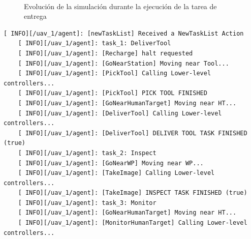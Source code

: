 \documentclass[fontsize=11pt, English=false, Español=true, Myfinal=true, twoside, numbers=noenddot]{scrbook}
\begin{document}
\begin{figure}[htbp]
    \\
    \hfill
    \caption{Evolución de la simulación durante la ejecución de la tarea de entrega}
    \label{fig:Gazebo_DeliverTree}
\end{figure}

\begin{lstlisting}[caption={Mensajes impresos por el Gestor de comportamiento durante la ejecución del plan completo}, breaklines=true, label=exit:firstPlanFeedback]
    [ INFO][/uav_1/agent]: [newTaskList] Received a NewTaskList Action
    [ INFO][/uav_1/agent]: task_1: DeliverTool
    [ INFO][/uav_1/agent]: [Recharge] halt requested
    [ INFO][/uav_1/agent]: [GoNearStation] Moving near Tool...
    [ INFO][/uav_1/agent]: [PickTool] Calling Lower-level controllers...
    [ INFO][/uav_1/agent]: [PickTool] PICK TOOL FINISHED
    [ INFO][/uav_1/agent]: [GoNearHumanTarget] Moving near HT...
    [ INFO][/uav_1/agent]: [DeliverTool] Calling Lower-level controllers...
    [ INFO][/uav_1/agent]: [DeliverTool] DELIVER TOOL TASK FINISHED (true)
    [ INFO][/uav_1/agent]: task_2: Inspect
    [ INFO][/uav_1/agent]: [GoNearWP] Moving near WP...
    [ INFO][/uav_1/agent]: [TakeImage] Calling Lower-level controllers...
    [ INFO][/uav_1/agent]: [TakeImage] INSPECT TASK FINISHED (true)
    [ INFO][/uav_1/agent]: task_3: Monitor
    [ INFO][/uav_1/agent]: [GoNearHumanTarget] Moving near HT...
    [ INFO][/uav_1/agent]: [MonitorHumanTarget] Calling Lower-level controllers...
\end{lstlisting}
\end{document}
